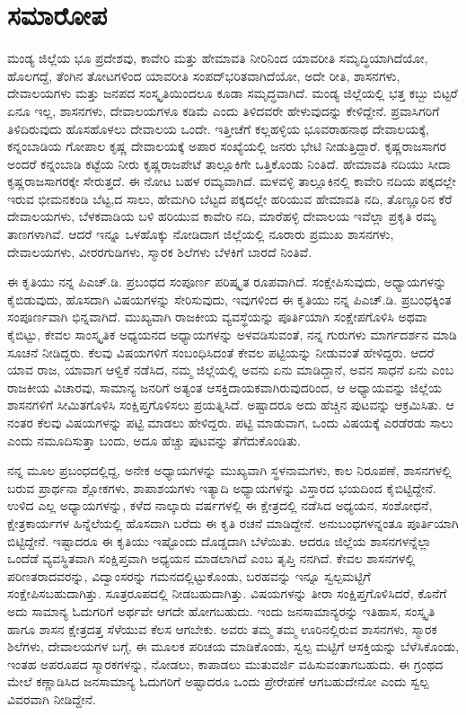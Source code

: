 
\chapter*{ಸಮಾರೋಪ}

ಮಂಡ್ಯ ಜಿಲ್ಲೆಯ ಭೂ ಪ್ರದೇಶವು, ಕಾವೇರಿ ಮತ್ತು ಹೇಮಾವತಿ ನೀರಿನಿಂದ ಯಾವರೀತಿ ಸಮೃದ್ಧಿಯಾಗಿದೆಯೋ, ಹೊಲಗದ್ದೆ, ತೆಂಗಿನ ತೋಟಗಳಿಂದ ಯಾವರೀತಿ ಸಂಪದ್​ಭರಿತವಾಗಿದೆಯೋ, ಅದೇ ರೀತಿ, ಶಾಸನಗಳು, ದೇವಾಲಯಗಳು ಮತ್ತು ಜನಪದ ಸಂಸ್ಕೃತಿಯಿಂದಲೂ ಕೂಡಾ ಸಮೃದ್ಧವಾಗಿದೆ. ಮಂಡ್ಯ ಜಿಲ್ಲೆಯಲ್ಲಿ ಭತ್ತ ಕಬ್ಬು ಬಿಟ್ಟರೆ ಏನೂ ಇಲ್ಲ, ಶಾಸನಗಳು, ದೇವಾಲಯಗಳೂ ಕಡಿಮೆ ಎಂದು ತಿಳಿದವರೇ ಹೇಳುವುದನ್ನು ಕೇಳಿದ್ದೇನೆ. ಪ್ರವಾಸಿಗರಿಗೆ ತಿಳಿದಿರುವುದು ಹೊಸಹೊಳಲು ದೇವಾಲಯ ಒಂದೇ. ಇತ್ತೀಚೆಗೆ ಕಲ್ಲಹಳ್ಳಿಯ ಭೂವರಾಹನಾಥ ದೇವಾಲಯಕ್ಕೆ, ಕನ್ನಂಬಾಡಿಯ ಗೋಪಾಲ ಕೃಷ್ಣ ದೇವಾಲಯಕ್ಕೆ ಅಪಾರ ಸಂಖ್ಯೆಯಲ್ಲಿ ಜನರು ಭೇಟಿ ನೀಡುತ್ತಿದ್ದಾರೆ. ಕೃಷ್ಣರಾಜಸಾಗರ ಅಂದರೆ ಕನ್ನಂಬಾಡಿ ಕಟ್ಟೆಯ ನೀರು ಕೃಷ್ಣರಾಜಪೇಟೆ ತಾಲ್ಲೂಕಿಗೇ ಒತ್ತಿಕೊಂಡು ನಿಂತಿದೆ. ಹೇಮಾವತಿ ನದಿಯು ಸೀದಾ ಕೃಷ್ಣರಾಜಸಾಗರಕ್ಕೇ ಸೇರುತ್ತದೆ. ಈ ನೋಟ ಬಹಳ ರಮ್ಯವಾಗಿದೆ. ಮಳವಳ್ಳಿ ತಾಲ್ಲೂಕಿನಲ್ಲಿ ಕಾವೇರಿ ನದಿಯ ಪಕ್ಕದಲ್ಲೇ ಇರುವ ಭೀಮನಕಂಡಿ ಬೆಟ್ಟ,ದ ಸಾಲು, ಹೇಮಗಿರಿ ಬೆಟ್ಟದ ಪಕ್ಕದಲ್ಲೇ ಹರಿಯುವ ಹೇಮಾವತಿ ನದಿ, ತೊಣ್ಣೂರಿನ ಕೆರೆ ದೇವಾಲಯಗಳು, ಬೆಳಕವಾಡಿಯ ಬಳಿ ಹರಿಯುವ ಕಾವೇರಿ ನದಿ, ಮಾರೆಹಳ್ಳಿ ದೇವಾಲಯ ಇವೆಲ್ಲಾ ಪ್ರಕೃತಿ ರಮ್ಯ ತಾಣಗಳಾಗಿವೆ. ಆದರೆ ಇನ್ನೂ ಒಳಹೊಕ್ಕು ನೋಡಿದಾಗ ಜಿಲ್ಲೆಯಲ್ಲಿ ನೂರಾರು ಪ್ರಮುಖ ಶಾಸನಗಳು, ದೇವಾಲಯಗಳು, ವೀರರಗುಡಿಗಳು, ಸ್ಮಾರಕ ಶಿಲೆಗಳು ಬೆಳಕಿಗೆ ಬಾರದೆ ನಿಂತಿವೆ.

ಈ ಕೃತಿಯು ನನ್ನ ಪಿಎಚ್​.ಡಿ. ಪ್ರಬಂಧದ ಸಂಪೂರ್ಣ ಪರಿಷ್ಕೃತ ರೂಪವಾಗಿದೆ. ಸಂಕ್ಷೇಪಿಸುವುದು, ಅಧ್ಯಾಯಗಳನ್ನು ಕೈಬಿಡುವುದು, ಹೊಸದಾಗಿ ವಿಷಯಗಳನ್ನು ಸೇರಿಸುವುದು, ಇವುಗಳಿಂದ ಈ ಕೃತಿಯು ನನ್ನ ಪಿಎಚ್​.ಡಿ. ಪ್ರಬಂಧಕ್ಕಿಂತ ಸಂಪೂರ್ಣವಾಗಿ ಭಿನ್ನವಾಗಿದೆ. ಮುಖ್ಯವಾಗಿ ರಾಜಕೀಯ ವ್ಯವಸ್ಥೆಯನ್ನು ಪೂರ್ತಿಯಾಗಿ ಸಂಕ್ಷೇಪಗೊಳಿಸಿ ಅಥವಾ ಕೈಬಿಟ್ಟು, ಕೇವಲ ಸಾಂಸ್ಕೃತಿಕ ಅಧ್ಯಯನದ ಅಧ್ಯಾಯಗಳನ್ನು ಅಳವಡಿಸುವಂತೆ, ನನ್ನ ಗುರುಗಳು ಮಾರ್ಗದರ್ಶನ ಮಾಡಿ ಸೂಚನೆ ನೀಡಿದ್ದರು. ಕೆಲವು ವಿಷಯಗಳಿಗೆ ಸಂಬಂಧಿಸಿದಂತೆ ಕೇವಲ ಪಟ್ಟಿಯನ್ನು ನೀಡುವಂತೆ ಹೇಳಿದ್ದರು. ಆದರೆ ಯಾವ ರಾಜ, ಯಾವಾಗ ಆಳ್ವಿಕೆ ನಡೆಸಿದ, ನಮ್ಮ ಜಿಲ್ಲೆಯಲ್ಲಿ ಅವನು ಏನು ಮಾಡಿದ್ದಾನೆ, ಅವನ ಸಾಧನೆ ಏನು ಎಂಬ ರಾಜಕೀಯ ವಿಚಾರವು, ಸಾಮಾನ್ಯ ಜನರಿಗೆ ಅತ್ಯಂತ ಆಸಕ್ತಿದಾಯಕವಾಗಿರುವುದರಿಂದ, ಆ ಅಧ್ಯಾಯವನ್ನು ಜಿಲ್ಲೆಯ ಶಾಸನಗಳಿಗೆ ಸೀಮಿತಗೊಳಿಸಿ ಸಂಕ್ಷಿಪ್ತಗೊಳಿಸಲು ಪ್ರಯತ್ನಿಸಿದೆ. ಅಷ್ಟಾದರೂ ಅದು ಹೆಚ್ಚಿನ ಪುಟವನ್ನು ಆಕ್ರಮಿಸಿತು. ಆ ನಂತರ ಕೆಲವು ವಿಷಯಗಳನ್ನು ಪಟ್ಟಿ ಮಾಡಲು ಹೇಳಿದ್ದರು. ಪಟ್ಟಿ ಮಾಡುವಾಗ, ಒಂದು ವಿಷಯಕ್ಕೆ ಎರಡೆರಡು ಸಾಲು ಎಂದು ನಮೂದಿಸುತ್ತಾ ಬಂದು, ಅದೂ ಹೆಚ್ಚು ಪುಟವನ್ನು ತೆಗೆದುಕೊಂಡಿತು.

ನನ್ನ ಮೂಲ ಪ್ರಬಂಧದಲ್ಲಿದ್ದ, ಅನೇಕ ಅಧ್ಯಾಯಗಳನ್ನು ಮುಖ್ಯವಾಗಿ ಸ್ಥಳನಾಮಗಳು, ಕಾಲ ನಿರೂಪಣೆ, ಶಾಸನಗಳಲ್ಲಿ ಬರುವ ಪ್ರಾರ್ಥನಾ ಶ್ಲೋಕಗಳು, ಶಾಪಾಶಯಗಳು ಇತ್ಯಾದಿ ಅಧ್ಯಾಯಗಳನ್ನು ವಿಸ್ತಾರದ ಭಯದಿಂದ ಕೈಬಿಟ್ಟಿದ್ದೇನೆ. ಉಳಿದ ಎಲ್ಲ ಅಧ್ಯಾಯಗಳನ್ನು, ಕಳೆದ ನಾಲ್ಕಾರು ವರ್ಷಗಳಲ್ಲಿ ಈ ಕ್ಷೇತ್ರದಲ್ಲಿ ನಡೆಸಿದ ಅಧ್ಯಯನ, ಸಂಶೋಧನೆ, ಕ್ಷೇತ್ರಕಾರ್ಯಗಳ ಹಿನ್ನೆಲೆಯಲ್ಲಿ ಹೊಸದಾಗಿ ಬರೆದು ಈ ಕೃತಿ ರಚನೆ ಮಾಡಿದ್ದೇನೆ. ಅನುಬಂಧಗಳನ್ನಂತೂ ಪೂರ್ತಿಯಾಗಿ ಬಿಟ್ಟಿದ್ದೇನೆ. ಇಷ್ಟಾದರೂ ಈ ಕೃತಿಯು ಇಷ್ಟೊಂದು ದೊಡ್ಡದಾಗಿ ಬೆಳೆಯಿತು. ಆದರೂ ಜಿಲ್ಲೆಯ ಶಾಸನಗಳನ್ನೆಲ್ಲಾ ಒಂದೆಡೆ ವ್ಯವಸ್ಥಿತವಾಗಿ ಸಂಕ್ಷಿಪ್ತವಾಗಿ ಅಧ್ಯಯನ ಮಾಡಲಾಗಿದೆ ಎಂಬ ತೃಪ್ತಿ ನನಗಿದೆ. ಕೇವಲ ಶಾಸನಗಳಲ್ಲಿ ಪರಿಣತರಾದವರನ್ನು, ವಿದ್ವಾಂಸರನ್ನು ಗಮನದಲ್ಲಿಟ್ಟುಕೊಂಡು, ಬರಹವನ್ನು ಇನ್ನೂ ಸ್ವಲ್ಪಮಟ್ಟಿಗೆ ಸಂಕ್ಷೇಪಿಸಬಹುದಾಗಿತ್ತು. ಸೂತ್ರರೂಪದಲ್ಲಿ ನೀಡಬಹುದಾಗಿತ್ತು. ವಿಷಯಗಳನ್ನು ತೀರಾ ಸಂಕ್ಷಿಪ್ತಗೊಳಿಸಿದರೆ, ಕೊನೆಗೆ ಅದು ಸಾಮಾನ್ಯ ಓದುಗರಿಗೆ ಅರ್ಥವೇ ಆಗದೇ ಹೋಗಬಹುದು. ಇಂದು ಜನಸಾಮಾನ್ಯರನ್ನು ಇತಿಹಾಸ, ಸಂಸ್ಕೃತಿ ಹಾಗೂ ಶಾಸನ ಕ್ಷೇತ್ರದತ್ತ ಸೆಳೆಯುವ ಕೆಲಸ ಆಗಬೇಕು. ಅವರು ತಮ್ಮ ತಮ್ಮ ಊರಿನಲ್ಲಿರುವ ಶಾಸನಗಳು, ಸ್ಮಾರಕ ಶಿಲೆಗಳು, ದೇವಾಲಯಗಳ ಬಗ್ಗೆ, ಈ ಮೂಲಕ ಪರಿಚಯ ಮಾಡಿಕೊಂಡು, ಸ್ವಲ್ಪ ಮಟ್ಟಿಗೆ ಆಸಕ್ತಿಯನ್ನು ಬೆಳೆಸಿಕೊಂಡು, ಇಂತಹ ಅಪರೂಪದ ಸ್ಮಾರಕಗಳನ್ನು, ನೋಡಲು, ಕಾಪಾಡಲು ಮುತುವರ್ಜಿ ವಹಿಸುವಂತಾಗಬಹುದು. ಈ ಗ್ರಂಥದ ಮೇಲೆ ಕಣ್ಣಾಡಿಸಿದ ಜನಸಾಮಾನ್ಯ ಓದುಗರಿಗೆ ಅಷ್ಟಾದರೂ ಒಂದು ಪ್ರೇರೇಪಣೆ ಆಗಬಹುದೇನೋ ಎಂದು ಸ್ವಲ್ಪ ವಿವರವಾಗಿ ನೀಡಿದ್ದೇನೆ.

